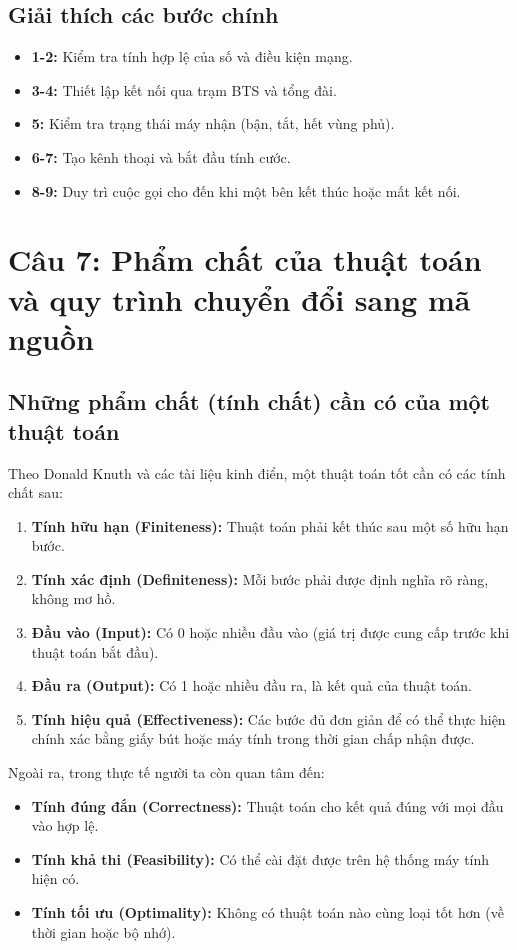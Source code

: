 \documentclass[12pt,a4paper]{article}
\begin{document}
\subsection*{Giải thích các bước chính}
\begin{itemize}
    \item \textbf{1-2:} Kiểm tra tính hợp lệ của số và điều kiện mạng.
    \item \textbf{3-4:} Thiết lập kết nối qua trạm BTS và tổng đài.
    \item \textbf{5:} Kiểm tra trạng thái máy nhận (bận, tắt, hết vùng phủ).
    \item \textbf{6-7:} Tạo kênh thoại và bắt đầu tính cước.
    \item \textbf{8-9:} Duy trì cuộc gọi cho đến khi một bên kết thúc hoặc mất kết nối.
\end{itemize}

\section*{Câu 7: Phẩm chất của thuật toán và quy trình chuyển đổi sang mã nguồn}

\subsection*{Những phẩm chất (tính chất) cần có của một thuật toán}

Theo Donald Knuth và các tài liệu kinh điển, một thuật toán tốt cần có các tính chất sau:

\begin{enumerate}
    \item \textbf{Tính hữu hạn (Finiteness):} Thuật toán phải kết thúc sau một số hữu hạn bước.
    \item \textbf{Tính xác định (Definiteness):} Mỗi bước phải được định nghĩa rõ ràng, không mơ hồ.
    \item \textbf{Đầu vào (Input):} Có 0 hoặc nhiều đầu vào (giá trị được cung cấp trước khi thuật toán bắt đầu).
    \item \textbf{Đầu ra (Output):} Có 1 hoặc nhiều đầu ra, là kết quả của thuật toán.
    \item \textbf{Tính hiệu quả (Effectiveness):} Các bước đủ đơn giản để có thể thực hiện chính xác bằng giấy bút hoặc máy tính trong thời gian chấp nhận được.
\end{enumerate}

Ngoài ra, trong thực tế người ta còn quan tâm đến:
\begin{itemize}
    \item \textbf{Tính đúng đắn (Correctness):} Thuật toán cho kết quả đúng với mọi đầu vào hợp lệ.
    \item \textbf{Tính khả thi (Feasibility):} Có thể cài đặt được trên hệ thống máy tính hiện có.
    \item \textbf{Tính tối ưu (Optimality):} Không có thuật toán nào cùng loại tốt hơn (về thời gian hoặc bộ nhớ).
\end{itemize}
\end{document}
